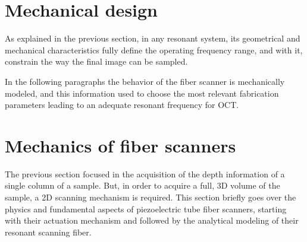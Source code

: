 \documentclass[10pt]{iopart}
\begin{document}
\section{Mechanical design}
\label{sec:mechDesign}
As explained in the previous section, in any resonant system, its geometrical and mechanical characteristics fully define the operating frequency range, and with it, constrain the way the final image can be sampled.

In the following paragraphs the behavior of the fiber scanner is mechanically modeled, and this information used to choose the most relevant fabrication parameters leading to an adequate resonant frequency for OCT.

\section{Mechanics of fiber scanners}

The previous section focused in the acquisition of the depth information of a single column of a sample. But, in order to acquire a full, 3D volume of the sample, a 2D scanning mechanism is required. This section briefly goes over the physics and fundamental aspects of piezoelectric tube fiber scanners, starting with their actuation mechanism and followed by the analytical modeling of their resonant scanning fiber.
\end{document}
